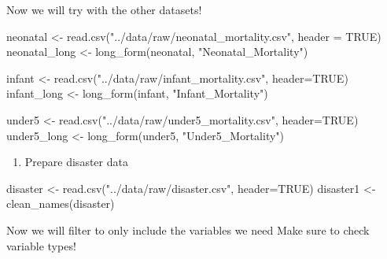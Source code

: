\documentclass[
  letterpaper,
  DIV=11,
  numbers=noendperiod]{scrartcl}
\newenvironment{Shaded}{\begin{snugshade}}{\end{snugshade}}
\newcommand{\AttributeTok}[1]{\textcolor[rgb]{0.40,0.45,0.13}{#1}}
\newcommand{\ConstantTok}[1]{\textcolor[rgb]{0.56,0.35,0.01}{#1}}
\newcommand{\FunctionTok}[1]{\textcolor[rgb]{0.28,0.35,0.67}{#1}}
\newcommand{\NormalTok}[1]{\textcolor[rgb]{0.00,0.23,0.31}{#1}}
\newcommand{\OtherTok}[1]{\textcolor[rgb]{0.00,0.23,0.31}{#1}}
\newcommand{\SpecialCharTok}[1]{\textcolor[rgb]{0.37,0.37,0.37}{#1}}
\newcommand{\StringTok}[1]{\textcolor[rgb]{0.13,0.47,0.30}{#1}}
\providecommand{\tightlist}{%
  \setlength{\itemsep}{0pt}\setlength{\parskip}{0pt}}
\begin{document}
Now we will try with the other datasets!

\begin{Shaded}
\begin{Highlighting}[]
\NormalTok{neonatal }\OtherTok{\textless{}{-}} \FunctionTok{read.csv}\NormalTok{(}\StringTok{"../data/raw/neonatal\_mortality.csv"}\NormalTok{, }\AttributeTok{header =} \ConstantTok{TRUE}\NormalTok{)}
\NormalTok{neonatal\_long }\OtherTok{\textless{}{-}} \FunctionTok{long\_form}\NormalTok{(neonatal, }\StringTok{"Neonatal\_Mortality"}\NormalTok{)}


\NormalTok{infant }\OtherTok{\textless{}{-}} \FunctionTok{read.csv}\NormalTok{(}\StringTok{"../data/raw/infant\_mortality.csv"}\NormalTok{, }\AttributeTok{header=}\ConstantTok{TRUE}\NormalTok{)}
\NormalTok{infant\_long }\OtherTok{\textless{}{-}} \FunctionTok{long\_form}\NormalTok{(infant, }\StringTok{"Infant\_Mortality"}\NormalTok{)}

\NormalTok{under5 }\OtherTok{\textless{}{-}} \FunctionTok{read.csv}\NormalTok{(}\StringTok{"../data/raw/under5\_mortality.csv"}\NormalTok{, }\AttributeTok{header=}\ConstantTok{TRUE}\NormalTok{)}
\NormalTok{under5\_long }\OtherTok{\textless{}{-}} \FunctionTok{long\_form}\NormalTok{(under5, }\StringTok{"Under5\_Mortality"}\NormalTok{)}
\end{Highlighting}
\end{Shaded}

\begin{enumerate}
\def\labelenumi{\arabic{enumi}.}
\setcounter{enumi}{1}
\tightlist
\item
  Prepare disaster data
\end{enumerate}

\begin{Shaded}
\begin{Highlighting}[]
\NormalTok{disaster }\OtherTok{\textless{}{-}} \FunctionTok{read.csv}\NormalTok{(}\StringTok{"../data/raw/disaster.csv"}\NormalTok{, }\AttributeTok{header=}\ConstantTok{TRUE}\NormalTok{)}
\NormalTok{disaster1 }\OtherTok{\textless{}{-}} \FunctionTok{clean\_names}\NormalTok{(disaster)}
\end{Highlighting}
\end{Shaded}

Now we will filter to only include the variables we need Make sure to
check variable types!

\begin{Shaded}
\end{Shaded}
\end{document}
